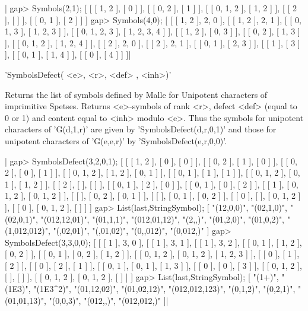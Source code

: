 |    gap> Symbols(2,1);
    [ [ [ 1, 2 ], [ 0 ] ], [ [ 0, 2 ], [ 1 ] ], [ [ 0, 1, 2 ], [ 1, 2 ] ],
      [ [ 2 ], [  ] ], [ [ 0, 1 ], [ 2 ] ] ]
    gap> Symbols(4,0);
    [ [ [ 1, 2 ], 2, 0 ], [ [ 1, 2 ], 2, 1 ],
      [ [ 0, 1, 3 ], [ 1, 2, 3 ] ], [ [ 0, 1, 2, 3 ], [ 1, 2, 3, 4 ] ],
      [ [ 1, 2 ], [ 0, 3 ] ], [ [ 0, 2 ], [ 1, 3 ] ],
      [ [ 0, 1, 2 ], [ 1, 2, 4 ] ], [ [ 2 ], 2, 0 ], [ [ 2 ], 2, 1 ],
      [ [ 0, 1 ], [ 2, 3 ] ], [ [ 1 ], [ 3 ] ], [ [ 0, 1 ], [ 1, 4 ] ],
      [ [ 0 ], [ 4 ] ] ]|


'SymbolsDefect( <e>, <r>, <def> , <inh>)'

Returns  the list of  symbols defined by  Malle for Unipotent characters of
imprimitive  Spetses. Returns <e>-symbols of  rank <r>, defect <def> (equal
to  0 or  1) and  content equal  to <inh>  modulo <e>. Thus the symbols for
unipotent  characters of  'G(d,1,r)' are  given by 'SymbolsDefect(d,r,0,1)'
and those for unipotent characters of 'G(e,e,r)' by
'SymbolsDefect(e,r,0,0)'.

|    gap> SymbolsDefect(3,2,0,1);
    [ [ [ 1, 2 ], [ 0 ], [ 0 ] ], [ [ 0, 2 ], [ 1 ], [ 0 ] ],
      [ [ 0, 2 ], [ 0 ], [ 1 ] ], [ [ 0, 1, 2 ], [ 1, 2 ], [ 0, 1 ] ],
      [ [ 0, 1 ], [ 1 ], [ 1 ] ], [ [ 0, 1, 2 ], [ 0, 1 ], [ 1, 2 ] ],
      [ [ 2 ], [  ], [  ] ], [ [ 0, 1 ], [ 2 ], [ 0 ] ],
      [ [ 0, 1 ], [ 0 ], [ 2 ] ], [ [ 1 ], [ 0, 1, 2 ], [ 0, 1, 2 ] ],
      [ [  ], [ 0, 2 ], [ 0, 1 ] ], [ [  ], [ 0, 1 ], [ 0, 2 ] ],
      [ [ 0 ], [  ], [ 0, 1, 2 ] ], [ [ 0 ], [ 0, 1, 2 ], [  ] ] ]
    gap> List(last,StringSymbol);
    [ "(12,0,0)", "(02,1,0)", "(02,0,1)", "(012,12,01)", "(01,1,1)",
      "(012,01,12)", "(2,,)", "(01,2,0)", "(01,0,2)", "(1,012,012)",
      "(,02,01)", "(,01,02)", "(0,,012)", "(0,012,)" ]
    gap> SymbolsDefect(3,3,0,0);
    [ [ [ 1 ], 3, 0 ], [ [ 1 ], 3, 1 ], [ [ 1 ], 3, 2 ],
      [ [ 0, 1 ], [ 1, 2 ], [ 0, 2 ] ], [ [ 0, 1 ], [ 0, 2 ], [ 1, 2 ] ],
      [ [ 0, 1, 2 ], [ 0, 1, 2 ], [ 1, 2, 3 ] ], [ [ 0 ], [ 1 ], [ 2 ] ],
      [ [ 0 ], [ 2 ], [ 1 ] ], [ [ 0, 1 ], [ 0, 1 ], [ 1, 3 ] ],
      [ [ 0 ], [ 0 ], [ 3 ] ], [ [ 0, 1, 2 ], [  ], [  ] ],
      [ [ 0, 1, 2 ], [ 0, 1, 2 ], [  ] ] ]
    gap> List(last,StringSymbol);
    [ "(1+)", "(1E3)", "(1E3^2)", "(01,12,02)", "(01,02,12)",
      "(012,012,123)", "(0,1,2)", "(0,2,1)", "(01,01,13)", "(0,0,3)",
      "(012,,)", "(012,012,)" ]|

%
%

